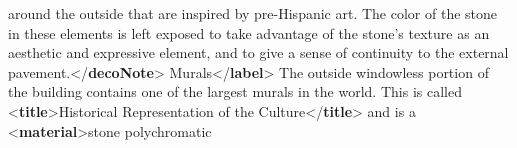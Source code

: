 \begin{shaded}
\hspace*{1em}\hspace*{1em}\hspace*{1em}\hspace*{1em}\hspace*{1em}\hspace*{1em} around the outside that are inspired by pre-Hispanic art. The color of the stone in these elements is left\mbox{}\newline 
\hspace*{1em}\hspace*{1em}\hspace*{1em}\hspace*{1em}\hspace*{1em}\hspace*{1em} exposed to take advantage of the stone's texture as an aesthetic and expressive element, and to give a\mbox{}\newline 
\hspace*{1em}\hspace*{1em}\hspace*{1em}\hspace*{1em}\hspace*{1em}\hspace*{1em} sense of continuity to the external pavement.{</\textbf{decoNote}>}\mbox{}\newline 
\hspace*{1em}\hspace*{1em}\mbox{}\newline 
\hspace*{1em}\hspace*{1em}\hspace*{1em}Murals{</\textbf{label}>}\mbox{}\newline 
\hspace*{1em}\hspace*{1em}\hspace*{1em}The outside windowless portion of the building contains one of the largest murals in the world. This is\mbox{}\newline 
\hspace*{1em}\hspace*{1em}\hspace*{1em}\hspace*{1em}\hspace*{1em}\hspace*{1em}\hspace*{1em}\hspace*{1em} called {<\textbf{title}>}Historical Representation of the Culture{</\textbf{title}>} and is a {<\textbf{material}>}stone polychromatic\mbox{}\newline 

\end{shaded}
